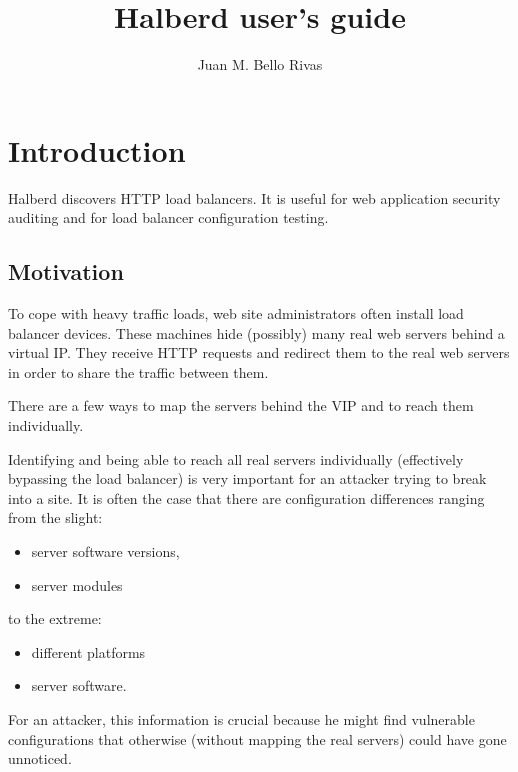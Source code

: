 \documentclass[a4paper]{book}
\begin{document}
\title{Halberd user's guide}
\author{Juan M. Bello Rivas}
\maketitle

\tableofcontents


\chapter{Introduction}

Halberd discovers HTTP load balancers. It is useful for web application
security auditing and for load balancer configuration testing.

\section{Motivation}

To cope with heavy traffic loads, web site administrators often install load
balancer devices. These machines hide (possibly) many real web servers behind
a virtual IP. They receive HTTP requests and redirect them to the real web
servers in order to share the traffic between them.

There are a few ways to map the servers behind the VIP and to reach them
individually.

Identifying and being able to reach all real servers individually (effectively
bypassing the load balancer) is very important for an attacker trying to break
into a site. It is often the case that there are configuration differences
ranging from the slight:

\begin{itemize}
  \item server software versions,
  \item server modules
\end{itemize}

to the extreme:

\begin{itemize}
  \item different platforms
  \item server software.
\end{itemize}

For an attacker, this information is crucial because he might find vulnerable
configurations that otherwise (without mapping the real servers) could have
gone unnoticed.
\end{document}
